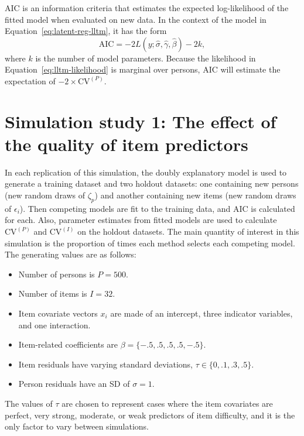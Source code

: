 AIC \parencite{akaike1974new} is an information criteria that estimates the expected log-likelihood of the fitted model when evaluated on new data. In the context of the model in Equation~\ref{eq:latent-reg-lltm}, it has the form
\begin{equation} 
	\mathrm{AIC} = -2 L(y ; \hat \sigma, \hat \gamma, \hat \beta) - 2k
,\end{equation}
where $k$ is the number of model parameters. Because the likelihood in Equation~\ref{eq:lltm-likelihood} is marginal over persons, AIC will estimate the expectation of $-2 \times \mathrm{CV}^{(P)}$.


\section{Simulation study 1: The effect of the quality of item predictors}

In each replication of this simulation, the doubly explanatory model is used to generate a training dataset and two holdout datasets: one containing new persons (new random draws of $\zeta_p$) and another containing new items (new random draws of $\epsilon_i$). 
Then competing models are fit to the training data, and AIC is calculated for each.  
Also, parameter estimates from fitted models are used to calculate $\mathrm{CV}^{(P)}$ and $\mathrm{CV}^{(I)}$ on the holdout datasets. The main quantity of interest in this simulation is the proportion of times each method selects each competing model. The generating values are as follows:
\begin{itemize}
	\item Number of persons is $P = 500$.
	\item Number of items is $I= 32$.
	\item Item covariate vectors $x_i$ are made of an intercept, three indicator variables, and one interaction.
	\item Item-related coefficients are $\beta = \{-.5, .5, .5, .5, -.5\}$.
	\item Item residuals have varying standard deviations, $\tau \in \{0, .1, .3, .5\}$.
	\item Person residuals have an SD of $\sigma = 1$.
\end{itemize}
The values of $\tau$ are chosen to represent cases where the item covariates are perfect, very strong, moderate, or weak predictors of item difficulty, and it is the only factor to vary between simulations.


